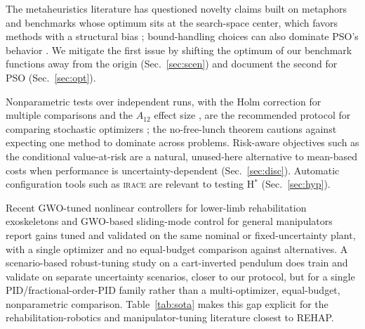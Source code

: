 \documentclass[10pt,journal,compsoc]{IEEEtran}
\newcommand{\rehap}{REHAP}
\begin{document}
The metaheuristics literature has questioned novelty claims built on metaphors \cite{sorensen2015,camacho2023} and benchmarks whose optimum sits at the search-space center, which favors methods with a structural bias \cite{kononova2014,kudela2022}; bound-handling choices can also dominate PSO's behavior \cite{helwig2013}. We mitigate the first issue by shifting the optimum of our benchmark functions \cite{suganthan2005,torn1989,ackley1987} away from the origin (Sec.~\ref{sec:scen}) and document the second for PSO (Sec.~\ref{sec:opt}).

Nonparametric tests over independent runs, with the Holm correction \cite{holm1979} for multiple comparisons and the $A_{12}$ effect size \cite{vargha2000}, are the recommended protocol for comparing stochastic optimizers \cite{derrac2011}; the no-free-lunch theorem \cite{wolpert1997} cautions against expecting one method to dominate across problems. Risk-aware objectives such as the conditional value-at-risk \cite{rockafellar2000} are a natural, unused-here alternative to mean-based costs when performance is uncertainty-dependent (Sec.~\ref{sec:disc}). Automatic configuration tools such as \textsc{irace} \cite{lopez2016} are relevant to testing H$^\ast$ (Sec.~\ref{sec:hyp}).

Recent GWO-tuned nonlinear controllers for lower-limb rehabilitation exoskeletons \cite{faraj2023,zheng2026} and GWO-based sliding-mode control for general manipulators \cite{rezoug2022} report gains tuned and validated on the same nominal or fixed-uncertainty plant, with a single optimizer and no equal-budget comparison against alternatives. A scenario-based robust-tuning study on a cart-inverted pendulum \cite{zorlu2026} does train and validate on separate uncertainty scenarios, closer to our protocol, but for a single PID/fractional-order-PID family rather than a multi-optimizer, equal-budget, nonparametric comparison. Table~\ref{tab:sota} makes this gap explicit for the rehabilitation-robotics and manipulator-tuning literature closest to \rehap{}.
\end{document}
